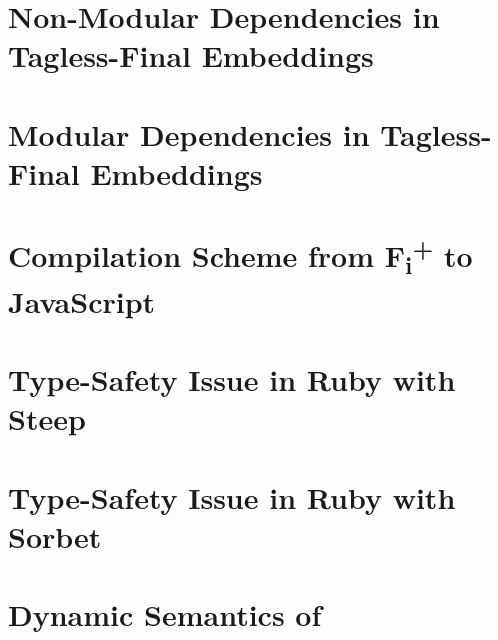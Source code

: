 \chapter{Non-Modular Dependencies in Tagless-Final Embeddings} \label{sec:tagless}


\chapter{Modular Dependencies in Tagless-Final Embeddings} \label{sec:fancier}


\chapter{Compilation Scheme from F\textsubscript{i}\!\textsuperscript{+} to JavaScript} \label{sec:fiplus-js}


\chapter{Type-Safety Issue in Ruby with Steep} \label{sec:steep}


\chapter{Type-Safety Issue in Ruby with Sorbet} \label{sec:sorbet}


\chapter{Dynamic Semantics of \lambdaiu} \label{sec:iu-dyn}

